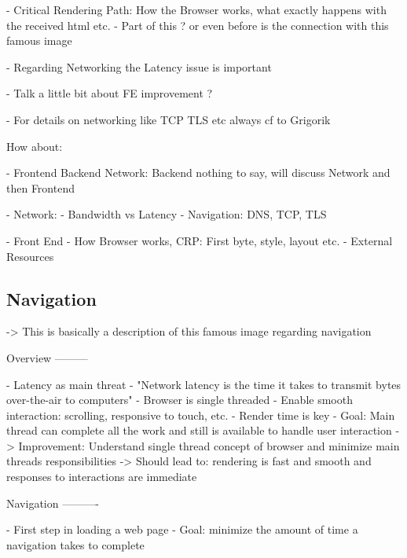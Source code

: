 - Critical Rendering Path: How the Browser works, what exactly happens with the received html etc.
- Part of this ? or even before is the connection with this famous image

- Regarding Networking the Latency issue is important

- Talk a little bit about FE improvement ?


- For details on networking like TCP TLS etc always cf to Grigorik



How about:

- Frontend Backend Network: Backend nothing to say, will discuss Network and then Frontend

- Network:
	- Bandwidth vs Latency
	- Navigation: DNS, TCP, TLS

- Front End
	- How Browser works, CRP: First byte, style, layout etc.
	- External Resources




\subsection{Navigation}






-> This is basically a description of this famous image regarding navigation

Overview
---------

- Latency as main threat
- "Network latency is the time it takes to transmit bytes over-the-air to computers"
- Browser is single threaded
- Enable smooth interaction: scrolling, responsive to touch, etc.
- Render time is key
- Goal: Main thread can complete all the work and still is available to handle user interaction
-> Improvement: Understand single thread concept of browser and minimize main threads responsibilities
-> Should lead to: rendering is fast and smooth and responses to interactions are immediate


Navigation
----------

- First step in loading a web page
- Goal:  minimize the amount of time a navigation takes to complete

